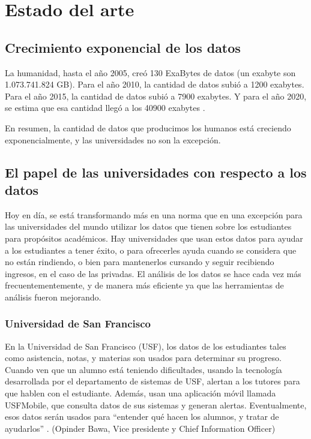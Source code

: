 \chapter{Estado del arte}
\label{sec:hello}

\section[Crecimiento exponencial de los datos]{Crecimiento exponencial de los datos} 


La humanidad, hasta el año 2005, creó 130 ExaBytes de datos (un exabyte son 1.073.741.824 GB). Para el año 2010, la cantidad de datos subió a 1200 exabytes. Para el año 2015, la cantidad de datos subió a 7900 exabytes. Y para el año 2020, se estima que esa cantidad llegó a los 40900 exabytes \cite{IDC}.

En resumen, la cantidad de datos que producimos los humanos está creciendo exponencialmente, y las universidades no son la excepción.



\section[El papel de las universidades con respecto a los datos]{El papel de las universidades con respecto a los datos}

Hoy en día, se está transformando más en una norma que en una excepción para las universidades del mundo utilizar los datos que tienen sobre los estudiantes para propósitos académicos. Hay universidades que usan estos datos para ayudar a los estudiantes a tener éxito, o para ofrecerles ayuda cuando se considera que no están rindiendo, o bien para mantenerlos cursando y seguir recibiendo ingresos, en el caso de las privadas.
El análisis de los datos se hace cada vez más frecuentementemente, y de manera más eficiente ya que las herramientas de análisis fueron mejorando.

\subsection[Universidad de San Francisco]{Universidad de San Francisco}

En la Universidad de San Francisco (USF), los datos de los estudiantes tales como asistencia, notas, y materias son usados para determinar su progreso. Cuando ven que un alumno está teniendo dificultades, usando la tecnología desarrollada por el departamento de sistemas de USF, alertan a los tutores para que hablen con el estudiante.
Además, usan una aplicación móvil llamada USFMobile, que consulta datos de sus sistemas y generan alertas.
Eventualmente, esos datos serán usados para “entender qué hacen los alumnos, y tratar de ayudarlos” . (Opinder Bawa, Vice presidente y Chief Information Officer)

